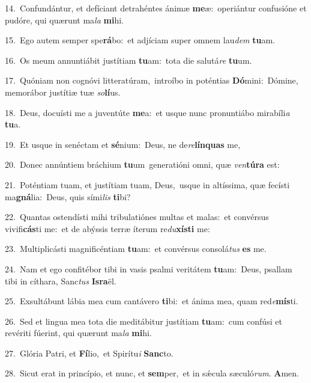 {\numbfont\textcolor{\numbcolor}{14.}}~Confundántur, et defíciant detrahéntes ánimæ \textbf{me}\-æ:~\star operiántur confusióne et pudóre, qui quærunt ma\textit{la} \textbf{mi}\-hi.\par
{\numbfont\textcolor{\numbcolor}{15.}}~Ego autem semper spe\-\textbf{rá}\-bo:~\star et adjíciam super omnem lau\textit{dem} \textbf{tu}\-am.\par
{\numbfont\textcolor{\numbcolor}{16.}}~Os meum annuntiábit justítiam \textbf{tu}\-am:~\star tota die salutá\textit{re} \textbf{tu}\-um.\par
{\numbfont\textcolor{\numbcolor}{17.}}~Quóniam non cognóvi litteratúram,~\dagger introíbo in poténtias \textbf{Dó}\-mini:~\star Dómine, memorábor justítiæ tuæ \textit{so}\-\textbf{lí}us.\par
{\numbfont\textcolor{\numbcolor}{18.}}~Deus, docuísti me a juventúte \textbf{me}\-a:~\star et usque nunc pronuntiábo mirabíli\textit{a} \textbf{tu}\-a.\par
{\numbfont\textcolor{\numbcolor}{19.}}~Et usque in senéctam et \textbf{sé}\-nium:~\star Deus, ne de\-\textit{re}\-\textbf{lín}\textbf{quas} me,\par
{\numbfont\textcolor{\numbcolor}{20.}}~Donec annúntiem bráchium \textbf{tu}\-um~\star generatióni omni, quæ \textit{ven}\-\textbf{tú}\textbf{ra} est:\par
{\numbfont\textcolor{\numbcolor}{21.}}~Poténtiam tuam, et justítiam tuam, Deus,~\dagger usque in altíssima, quæ fecísti ma\-\textbf{gná}\-lia:~\star Deus, quis sími\textit{lis} \textbf{ti}\-bi?\par
{\numbfont\textcolor{\numbcolor}{22.}}~Quantas ostendísti mihi tribulatiónes multas et malas:~\dagger et convérsus vivifi\-\textbf{cás}\-ti me:~\star et de abýssis terræ íterum re\-\textit{du}\-\textbf{xís}\textbf{ti} me:\par
{\numbfont\textcolor{\numbcolor}{23.}}~Multiplicásti magnificéntiam \textbf{tu}\-am:~\star et convérsus consolá\textit{tus} \textbf{es} me.\par
{\numbfont\textcolor{\numbcolor}{24.}}~Nam et ego confitébor tibi in vasis psalmi veritátem \textbf{tu}\-am:~\star Deus, psallam tibi in cíthara, Sanc\textit{tus} \textbf{Is}\-\textbf{ra}ël.\par
{\numbfont\textcolor{\numbcolor}{25.}}~Exsultábunt lábia mea cum cantávero \textbf{ti}\-bi:~\star et ánima mea, quam red\-\textit{e}\-\textbf{mís}ti.\par
{\numbfont\textcolor{\numbcolor}{26.}}~Sed et lingua mea tota die meditábitur justítiam \textbf{tu}\-am:~\star cum confúsi et revériti fúerint, qui quærunt ma\textit{la} \textbf{mi}\-hi.\par
{\numbfont\textcolor{\numbcolor}{27.}}~Glória Patri, et \textbf{Fí}\-lio,~\star et Spirítu\textit{i} \textbf{Sanc}\-to.\par
{\numbfont\textcolor{\numbcolor}{28.}}~Sicut erat in princípio, et nunc, et \textbf{sem}\-per,~\star et in sǽcula sæculó\-\textit{rum}\-. \textbf{A}\-men.\par
